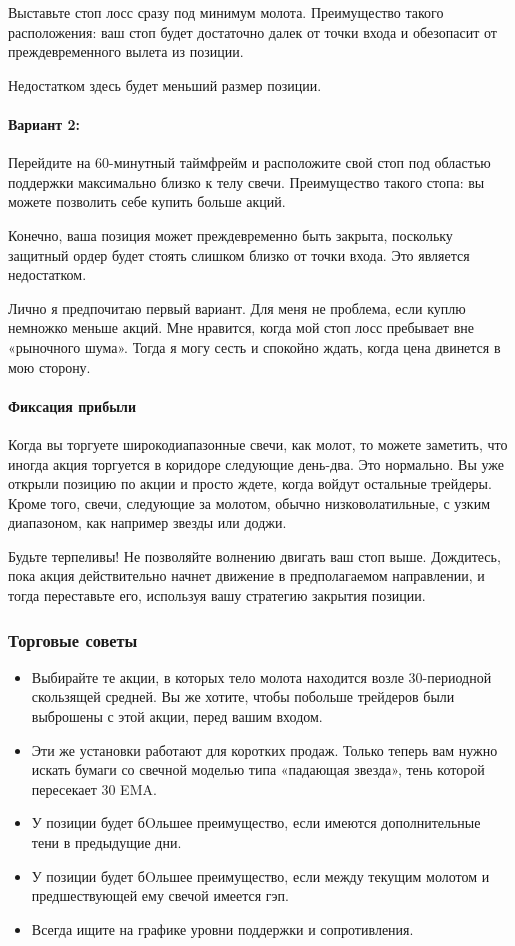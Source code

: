 \documentclass[a5paper]{article}
\begin{document}
Выставьте стоп лосс сразу под минимум молота. Преимущество такого расположения: ваш стоп будет достаточно далек от точки входа и обезопасит от преждевременного вылета из позиции.

Недостатком здесь будет меньший размер позиции.

\paragraph{Вариант 2:}

Перейдите на 60-минутный таймфрейм и расположите свой стоп под областью поддержки максимально близко к телу свечи. Преимущество такого стопа: вы можете позволить себе купить больше акций.

Конечно, ваша позиция может преждевременно быть закрыта, поскольку защитный ордер будет стоять слишком близко от точки входа. Это является недостатком.

Лично я предпочитаю первый вариант. Для меня не проблема, если куплю
немножко меньше акций. Мне нравится, когда мой стоп лосс пребывает вне
«рыночного шума». Тогда я могу сесть и спокойно ждать, когда цена
двинется в мою сторону.

\paragraph{Фиксация прибыли}

Когда вы торгуете широкодиапазонные свечи, как молот, то можете заметить, что иногда акция торгуется в коридоре следующие день-два. Это нормально. Вы уже открыли позицию по акции и просто ждете, когда войдут остальные трейдеры. Кроме того, свечи, следующие за молотом, обычно низковолатильные, с узким диапазоном, как например звезды или доджи.

Будьте терпеливы! Не позволяйте волнению двигать ваш стоп
выше. Дождитесь, пока акция действительно начнет движение в
предполагаемом направлении, и тогда переставьте его, используя вашу
стратегию закрытия позиции.

\subsubsection{Торговые советы}
\begin{itemize}
\item     Выбирайте те акции, в которых тело молота находится возле 30-периодной скользящей средней. Вы же хотите, чтобы побольше трейдеров были выброшены с этой акции, перед вашим входом.
\item     Эти же установки работают для коротких продаж. Только теперь вам нужно искать бумаги со свечной моделью типа «падающая звезда», тень которой пересекает 30 EMA.
\item     У позиции будет бOльшее преимущество, если имеются дополнительные тени в предыдущие дни.
\item     У позиции будет бOльшее преимущество, если между текущим молотом и предшествующей ему свечой имеется гэп.
\item     Всегда ищите на графике уровни поддержки и сопротивления.
\end{itemize}
\end{document}
